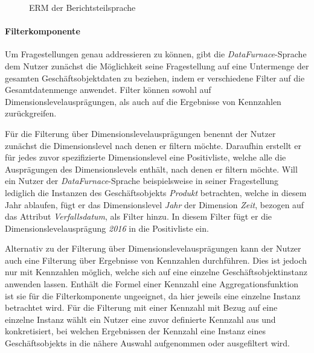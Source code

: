 \documentclass[
  language=german, %
  type=bachelor,%
  ngerman
]{isthesis}
\begin{document}
\begin{content}
  \begin{figure}
    \resizebox{250px}{!}{}
    \caption{\acrshort{ERM} der Berichtsteilsprache}\label{language_spec-erm-bericht}
  \end{figure}
  
  \paragraph{Filterkomponente}\label{paragraph:filternde-komponente} Um
  Fragestellungen genau addressieren zu können, gibt die
  \textit{DataFurnace}-Sprache dem Nutzer zunächst die Möglichkeit seine
  Fragestellung auf eine Untermenge der gesamten Geschäftsobjektdaten zu
  beziehen, indem er verschiedene Filter auf die Gesamtdatenmenge anwendet.
  Filter können sowohl auf Dimensionslevelausprägungen, als auch auf die
  Ergebnisse von Kennzahlen zurückgreifen. 
  
  Für die Filterung über Dimensionslevelausprägungen benennt der Nutzer
  zunächst die Dimensionslevel nach denen er filtern möchte. Daraufhin erstellt
  er für jedes zuvor spezifizierte Dimensionslevel eine Positivliste, welche
  alle die Ausprägungen des Dimensionslevels enthält, nach denen er filtern
  möchte. Will ein Nutzer der \textit{DataFurnace}-Sprache beispielsweise in
  seiner Fragestellung lediglich die Instanzen des Geschäftsobjekts
  \textit{Produkt} betrachten, welche in diesem Jahr ablaufen, fügt er das
  Dimensionslevel \textit{Jahr} der Dimension \textit{Zeit}, bezogen auf das
  Attribut \textit{Verfallsdatum}, als Filter hinzu. In diesem Filter fügt er
  die Dimensionslevelausprägung \textit{2016} in die Positivliste ein.

	Alternativ zu der Filterung über Dimensionslevelausprägungen kann der Nutzer
	auch eine Filterung über Ergebnisse von Kennzahlen durchführen. Dies ist
	jedoch nur mit Kennzahlen möglich, welche sich auf eine einzelne
	Geschäftsobjektinstanz anwenden lassen. Enthält die Formel einer Kennzahl
	eine Aggregationsfunktion ist sie für die Filterkomponente ungeeignet, da
	hier jeweils eine einzelne Instanz betrachtet wird. Für die Filterung mit
	einer Kennzahl mit Bezug auf eine einzelne Instanz wählt ein Nutzer eine
	zuvor definierte Kennzahl aus und konkretisiert, bei welchen Ergebnissen der
	Kennzahl eine Instanz eines Geschäftsobjekts in die nähere Auswahl
	aufgenommen oder ausgefiltert wird.


\end{content}
\end{document}

